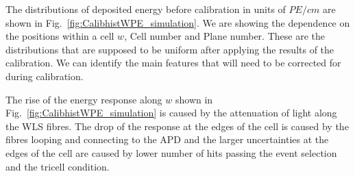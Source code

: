 The distributions of deposited energy before calibration in units of $\unit{PE/cm}$ are shown in Fig.~\ref{fig:CalibhistWPE_simulation}. We are showing the dependence on the positions within a cell $w$, Cell number and Plane number. These are the distributions that are supposed to be uniform after applying the results of the calibration. We can identify the main features that will need to be corrected for during calibration.

The rise of the energy response along $w$ shown in Fig.~\ref{fig:CalibhistWPE_simulation} is caused by the attenuation of light along the \gls{WLS} fibres. The drop of the response at the edges of the cell is caused by the fibres looping and connecting to the \gls{APD} and the larger uncertainties at the edges of the cell are caused by lower number of hits passing the event selection and the tricell condition.

